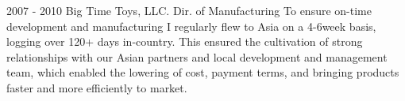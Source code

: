 \vfill\null
\cvevent
{2007 - 2010}
{Big Time Toys, LLC.}
{Dir. of Manufacturing}
{To ensure on-time development and manufacturing I regularly flew to Asia on a 4-6week basis, logging over 120+ days in-country. This ensured the cultivation of strong relationships with our Asian partners and local development and management team, which enabled the lowering of cost, payment terms, and bringing products faster and more efficiently to market.}
{}
{}
{}